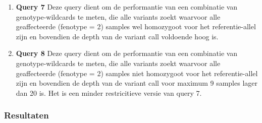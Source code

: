 \begin{enumerate}
\begin{adjustwidth}{-1.0in}{}

\end{adjustwidth}

\item \textbf{Query 7} Deze query dient om de performantie van een combinatie van genotype-wildcards te meten, die alle variants zoekt waarvoor alle geaffecteerde (fenotype = 2) samples wel homozygoot voor het referentie-allel zijn en bovendien de depth van de variant call voldoende hoog is.

\begin{adjustwidth}{-1.0in}{}

\end{adjustwidth}

\item \textbf{Query 8} Deze query dient om de performantie van een combinatie van genotype-wildcards te meten, die alle variants zoekt waarvoor alle geaffecteerde (fenotype = 2) samples niet homozygoot voor het referentie-allel zijn en bovendien de depth van de variant call voor maximum 9 samples lager dan 20 is. Het is een minder restricitieve versie van query 7.

\begin{adjustwidth}{-1.0in}{}

\end{adjustwidth}

\end{enumerate}

\newpage
\subsubsection{Resultaten}

